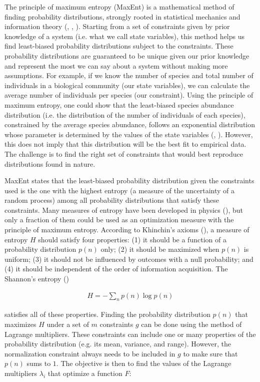 The principle of maximum entropy (MaxEnt) is a mathematical method of finding
probability distributions, strongly rooted in statistical mechanics and
information theory (\cite{Jaynes1957Information}, \cite{Jaynes1957Informationa},
\cite{Harremoes2001Maximum}). Starting from a set of constraints given by prior
knowledge of a system (i.e. what we call state variables), this method helps us
find least-biased probability distributions subject to the constraints. These
probability distributions are guaranteed to be unique given our prior knowledge
and represent the most we can say about a system without making more
assumptions. For example, if we know the number of species and total number of
individuals in a biological community (our state variables), we can calculate
the average number of individuals per species (our constraint). Using the
principle of maximum entropy, one could show that the least-biased species
abundance distribution (i.e. the distribution of the number of individuals of
each species), constrained by the average species abundance, follows an
exponential distribution whose parameter is determined by the values of the
state variables (\cite{Frank2011Simple}, \cite{Harte2014Maximum}). However,
this does not imply that this distribution will be the best fit to empirical
data. The challenge is to find the right set of constraints that would best
reproduce distributions found in nature. 

MaxEnt states that the least-biased probability distribution given the
constraints used is the one with the highest entropy (a measure of the
uncertainty of a random process) among all probability distributions that
satisfy these constraints. Many measures of entropy have been developed in
physics (\cite{Beck2009Generalised}), but only a fraction of them could be used
as an optimization measure with the principle of maximum entropy. According to
Khinchin's axioms (\cite{Khinchin1957Mathematical}), a measure of entropy $H$
should satisfy four properties: (1) it should be a function of a probability
distribution $p(n)$ only; (2) it should be maximized when $p(n)$ is uniform; (3)
it should not be influenced by outcomes with a null probability; and (4) it
should be independent of the order of information acquisition. The Shannon's
entropy (\cite{Shannon1948Mathematical})

\begin{eqnarray}
  \label{eq:shannon}
          H = -\sum_{n} p(n) \log p(n)
\end{eqnarray}

satisfies all of these properties. Finding the probability distribution $p(n)$
that maximizes $H$ under a set of $m$ constraints $g$ can be done using the
method of Lagrange multipliers. These constraints can include one or many
properties of the probability distribution (e.g. its mean, variance, and range).
However, the normalization constraint always needs to be included in $g$ to make
sure that $p(n)$ sums to $1$. The objective is then to find the values of the
Lagrange multipliers $\lambda_i$ that optimize a function $F$: 

